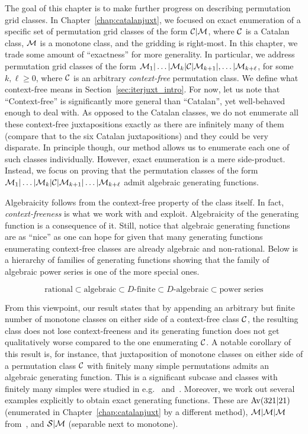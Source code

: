 \documentclass[12pt, a4paper, twoside]{report}
\begin{document}
The goal of this chapter is to make further progress on describing permutation grid classes. In Chapter~\ref{chap:catalanjuxt}, we focused on exact enumeration of a specific set of permutation grid classes of the form $\mathcal{C}|\mathcal{M}$, where $\mathcal{C}$ is a Catalan class, $\mathcal{M}$ is a monotone class, and the gridding is right-most. In this chapter, we trade some amount of ``exactness'' for more generality. In particular, we address permutation grid classes of the form $\mathcal{M}_1|\ldots|\mathcal{M}_k|\mathcal{C}|\mathcal{M}_{k+1}|,\ldots|\mathcal{M}_{k+\ell}$, for some $k,\ell \geq 0$, where $\mathcal{C}$ is an arbitrary \emph{context-free} permutation class. We define what context-free means in Section~\ref{sec:iterjuxt_intro}. For now, let us note that ``Context-free'' is significantly more general than ``Catalan'', yet well-behaved enough to deal with. As opposed to the Catalan classes, we do not enumerate all these context-free juxtapositions exactly as there are infinitely many of them (compare that to the six Catalan juxtapositions) and they could be very disparate. In principle though, our method allows us to enumerate each one of such classes individually. However, exact enumeration is a mere side-product. Instead, we focus on proving that the permutation classes of the form $\mathcal{M}_1|\ldots|\mathcal{M}_k|\mathcal{C}|\mathcal{M}_{k+1}|\ldots|\mathcal{M}_{k+\ell}$ admit algebraic generating functions.

Algebraicity follows from the context-free property of the class itself. In fact, \emph{context-freeness} is what we work with and exploit. Algebraicity of the generating function is a consequence of it. Still, notice that algebraic generating functions are as ``nice'' as one can hope for given that many generating functions enumerating context-free classes are already algebraic and non-rational. Below is a hierarchy of families of generating functions showing that the family of algebraic power series is one of the more special ones.

$$\text{rational} \subset \text{algebraic} \subset \text{$D$-finite} \subset \text{$D$-algebraic} \subset \text{power series}$$

From this viewpoint, our result states that by appending an arbitrary but finite number of monotone classes on either side of a context-free class $\mathcal{C}$, the resulting class does not lose context-freeness and its generating function does not get qualitatively worse compared to the one enumerating $\mathcal{C}$. A notable corollary of this result is, for instance, that juxtaposition of monotone classes on either side of a permutation class $\mathcal{C}$ with finitely many simple permutations admits an algebraic generating function. This is a significant subcase and classes with finitely many simples were studied in e.g.~\cite{albertatkinsonrestricted} and~\cite{brignall2008simple}. Moreover, we work out several examples explicitly to obtain exact generating functions. These are $\mathrm{Av}(321|21)$ (enumerated in Chapter~\ref{chap:catalanjuxt} by a different method), $\mathcal{M}|\mathcal{M}|\mathcal{M}$ from~\cite{bevan2015thesis}, and $\mathcal{S}|\mathcal{M}$ (separable next to monotone).
\end{document}
